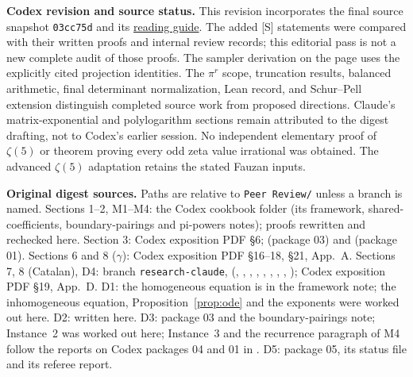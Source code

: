 \documentclass[11pt,a4paper]{article}
\newcommand{\st}[1]{\textsf{[#1]}}
\theoremstyle{definition}
\begin{document}
\noindent\textbf{Codex revision and source status.}
This revision incorporates the final source snapshot \texttt{03cc75d} and its
\href{https://github.com/BoomydayCoder/Mathathon/blob/03cc75d694220d0fba888c637e573a29799e6d5b/codex/START_HERE.md}{reading guide}.
The added \st{S} statements were compared with their written proofs and internal review records;
this editorial pass is not a new complete audit of those proofs. The sampler derivation on the page
uses the explicitly cited projection identities. The $\pi^r$ scope, truncation results, balanced
arithmetic, final determinant normalization, Lean record, and Schur--Pell extension distinguish
completed source work from proposed directions. Claude's matrix-exponential and polylogarithm
sections remain attributed to the digest drafting, not to Codex's earlier session.
No independent elementary proof of $\zeta(5)$ or theorem proving every odd zeta value irrational
was obtained. The advanced $\zeta(5)$ adaptation retains the stated Fauzan inputs.

\noindent\textbf{Original digest sources.} Paths are relative to \texttt{Peer Review/} unless a branch is named.
Sections 1--2, M1--M4: the Codex cookbook folder (its framework, shared-coefficients,
boundary-pairings and pi-powers notes); proofs rewritten and rechecked here.
Section 3: Codex exposition PDF \S6;  (package 03) and
 (package 01). Sections 6 and 8 ($\gamma$): Codex exposition PDF
\S16--18, \S21, App.~A. Sections 7, 8 (Catalan), D4: branch \texttt{research-claude},
 (, , ,
, , , ,
, ); Codex exposition PDF \S19, App.~D. D1: the
homogeneous equation is in the framework note; the inhomogeneous equation,
Proposition~\ref{prop:ode} and the exponents were worked out here. D2: written here. D3: package 03
and the boundary-pairings note; Instance~2 was worked out here; Instance~3 and the recurrence
paragraph of M4 follow the reports on Codex packages 04 and 01 in . D5:
package 05, its status file and its referee report.
\end{document}

